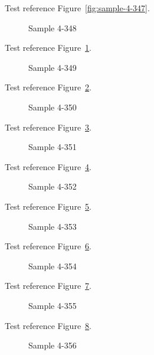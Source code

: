 Test reference Figure~\ref{fig:sample-4-347}.

\begin{figure}[tbhp]
\caption{Sample 4-348}
\label{fig:sample-4-348}
\end{figure}

Test reference Figure~\ref{fig:sample-4-348}.

\begin{figure}[tbhp]
\caption{Sample 4-349}
\label{fig:sample-4-349}
\end{figure}

Test reference Figure~\ref{fig:sample-4-349}.

\begin{figure}[tbhp]
\caption{Sample 4-350}
\label{fig:sample-4-350}
\end{figure}

Test reference Figure~\ref{fig:sample-4-350}.

\begin{figure}[tbhp]
\caption{Sample 4-351}
\label{fig:sample-4-351}
\end{figure}

Test reference Figure~\ref{fig:sample-4-351}.

\begin{figure}[tbhp]
\caption{Sample 4-352}
\label{fig:sample-4-352}
\end{figure}

Test reference Figure~\ref{fig:sample-4-352}.

\begin{figure}[tbhp]
\caption{Sample 4-353}
\label{fig:sample-4-353}
\end{figure}

Test reference Figure~\ref{fig:sample-4-353}.

\begin{figure}[tbhp]
\caption{Sample 4-354}
\label{fig:sample-4-354}
\end{figure}

Test reference Figure~\ref{fig:sample-4-354}.

\begin{figure}[tbhp]
\caption{Sample 4-355}
\label{fig:sample-4-355}
\end{figure}

Test reference Figure~\ref{fig:sample-4-355}.

\begin{figure}[tbhp]
\caption{Sample 4-356}
\label{fig:sample-4-356}
\end{figure}

